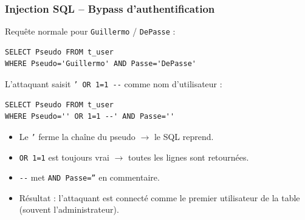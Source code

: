 \documentclass{beamer}
\def\emptyline{\vspace{10pt}}
\begin{document}
\begin{frame}[fragile]
\frametitle{Injection SQL -- Bypass d'authentification}

Requête normale pour \texttt{Guillermo} / \texttt{DePasse} :
\begin{lstlisting}[basicstyle=\ttfamily\scriptsize,frame=single]
SELECT Pseudo FROM t_user
WHERE Pseudo='Guillermo' AND Passe='DePasse'
\end{lstlisting}

\emptyline
L'attaquant saisit \texttt{' OR 1=1 -{}-} comme nom d'utilisateur :
\begin{lstlisting}[basicstyle=\ttfamily\scriptsize,frame=single]
SELECT Pseudo FROM t_user
WHERE Pseudo='' OR 1=1 --' AND Passe=''
\end{lstlisting}

\begin{itemize}
\item Le \texttt{'} ferme la chaîne du pseudo $\rightarrow$ le SQL reprend.
\item \texttt{OR 1=1} est \alert{toujours vrai} $\rightarrow$ toutes les lignes sont retournées.
\item \texttt{-{}-} met \texttt{AND Passe=''} en commentaire.
\item Résultat : l'attaquant est connecté comme le \alert{premier utilisateur} de la table (souvent l'administrateur).
\end{itemize}
\end{frame}
\end{document}
